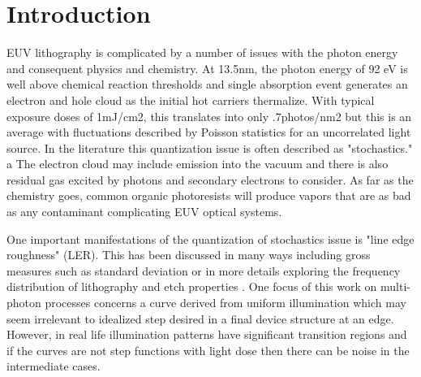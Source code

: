 \maketitle
\tableofcontents
\newpage

\newcommand{\mjmdt}[1]{\frac{d#1}{dt}}
\newcommand{\mjmdtt}[1]{\frac{d^2#1}{dt^2}}
\newcommand{\mjmdtn}[2]{\frac{d^{#1}#2}{dt^{#1}}}
\newcommand{\mjmdphi}[1]{\frac{d#1}{d\phi}}


\section{Introduction  }

EUV lithography is complicated by a number of issues with the
photon energy and consequent physics and chemistry.
At 13.5nm, the photon energy of 92 eV is well above chemical
reaction thresholds and single absorption event generates
an electron and hole cloud as the initial hot carriers thermalize.
With typical exposure doses of 1mJ/cm2, this translates into only 
.7photos/nm2 but this is an average with fluctuations described by
Poisson statistics for an uncorrelated light source. In the literature
this quantization issue is often described as "stochastics."
\cite{Denbeaux_Azhari_Ai_Understanding_onset_}a
\cite{Mack_Stochastic_limitations_2018}
  The electron 
cloud may include emission into the vacuum and there is also residual gas
excited by photons and secondary electrons to consider.
As far as the chemistry goes, common organic photoresists
will produce vapors that are as bad as any contaminant complicating
EUV optical systems. 

One important manifestations of the quantization of stochastics
issue is "line edge roughness" (LER). This has been discussed
in many ways including gross measures such as standard deviation
or in more details exploring the frequency distribution of lithography
and etch properties \cite{Mack_Reducing_roughness_extreme_2018}.
One focus of this work on multi-photon processes concerns
a curve derived from uniform illumination which may seem irrelevant to 
idealized step desired in a final device structure at an edge.
However, in real life illumination patterns have significant transition
regions and if the curves are not step functions with light dose
then there can be noise in the intermediate cases. 




